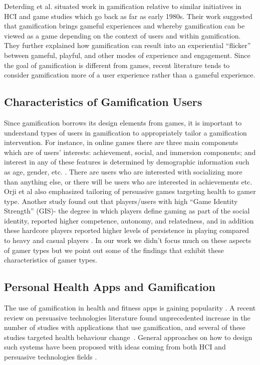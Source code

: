 \documentclass{sig-alternate}
\begin{document}
Deterding et al. \cite{deterding2011game} situated work in gamification relative to similar initiatives in HCI and game studies which go back as far as early 1980s. Their work suggested that gamification brings gameful experiences and whereby gamification can be viewed as a game depending on the context of users and within gamification. They further explained how gamification can result into an experiential ``flicker'' between gameful, playful, and other modes of experience and engagement. Since the goal of gamification is different from games, recent literature  tends to consider gamification more of a user experience rather than a gameful experience\cite{seaborn2015:gamification}.
\subsection{Characteristics of Gamification Users}
Since gamification borrows its design elements from games, it is important to understand types of users in gamification to appropriately tailor a gamification intervention. For instance, in online games there are three main components which are of users' interests: achievement, social, and immersion components; and interest in any of these features is determined by demographic information such as age, gender, etc. \cite{yee2006:motivations}. There are users who are interested with socializing more than anything else, or there will be users who are interested in achievements etc. Orji et al also \cite{orji2013:tailoring} emphasized tailoring of persuasive games targeting health to gamer type. Another study found out that players/users with high ``Game Identity Strength'' (GIS)- the degree in which players define gaming as part of the social identity, reported higher competence, autonomy, and relatedness, and in addition these hardcore players reported higher levels of persistence in playing compared to heavy and casual players \cite{neys2014:exploring}. In our work we didn't focus much on these aspects of gamer types but we point out some of the findings that exhibit these characteristics of gamer types. 
\subsection{Personal Health Apps and Gamification}  
The use of gamification in health and fitness apps is gaining popularity \cite{lister2014:just}. A recent review on persuasive technologies literature found unprecedented increase in the number of studies with applications that use gamification, and several of these studies targeted health behaviour change~\cite{hamari2014persuasive}. General approaches on how to design such systems have been proposed with ideas coming from both HCI\cite{li2010:stage} and persuasive technologies fields \cite{fogg2009:behavior,Oinas-kukkonen:psd,Oinas-Kukkonen:foundation}.
\end{document}
